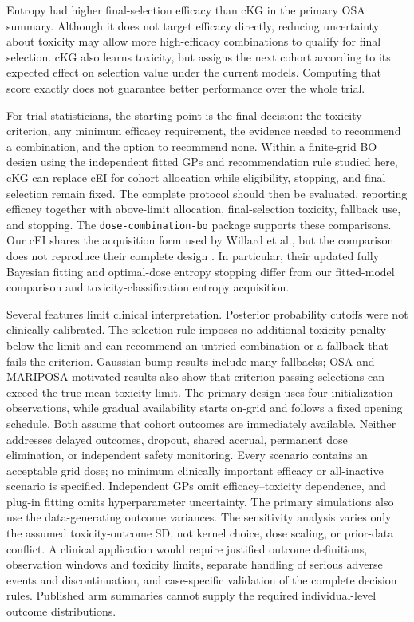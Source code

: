 \documentclass[11pt]{article}
\newcommand{\rev}[1]{{#1}}
\begin{document}
\rev{Entropy had higher final-selection efficacy than cKG in the primary OSA summary. Although it does not target efficacy directly, reducing uncertainty about toxicity may allow more high-efficacy combinations to qualify for final selection. cKG also learns toxicity, but assigns the next cohort according to its expected effect on selection value under the current models. Computing that score exactly does not guarantee better performance over the whole trial.}

\rev{For trial statisticians, the starting point is the final decision: the toxicity criterion, any minimum efficacy requirement, the evidence needed to recommend a combination, and the option to recommend none. Within a finite-grid BO design using the independent fitted GPs and recommendation rule studied here, cKG can replace cEI for cohort allocation while eligibility, stopping, and final selection remain fixed. The complete protocol should then be evaluated, reporting efficacy together with above-limit allocation, final-selection toxicity, fallback use, and stopping. The \texttt{dose-combination-bo} package supports these comparisons. Our cEI shares the acquisition form used by Willard et al., but the comparison does not reproduce their complete design \citep{willardobd,willardobd2026}. In particular, their updated fully Bayesian fitting and optimal-dose entropy stopping differ from our fitted-model comparison and toxicity-classification entropy acquisition.}

\rev{Several features limit clinical interpretation. Posterior probability cutoffs were not clinically calibrated. The selection rule imposes no additional toxicity penalty below the limit and can recommend an untried combination or a fallback that fails the criterion. Gaussian-bump results include many fallbacks; OSA and MARIPOSA-motivated results also show that criterion-passing selections can exceed the true mean-toxicity limit. The primary design uses four initialization observations, while gradual availability starts on-grid and follows a fixed opening schedule. Both assume that cohort outcomes are immediately available. Neither addresses delayed outcomes, dropout, shared accrual, permanent dose elimination, or independent safety monitoring. Every scenario contains an acceptable grid dose; no minimum clinically important efficacy or all-inactive scenario is specified. Independent GPs omit efficacy--toxicity dependence, and plug-in fitting omits hyperparameter uncertainty. The primary simulations also use the data-generating outcome variances. The sensitivity analysis varies only the assumed toxicity-outcome SD, not kernel choice, dose scaling, or prior-data conflict. A clinical application would require justified outcome definitions, observation windows and toxicity limits, separate handling of serious adverse events and discontinuation, and case-specific validation of the complete decision rules. Published arm summaries cannot supply the required individual-level outcome distributions.}
\end{document}
